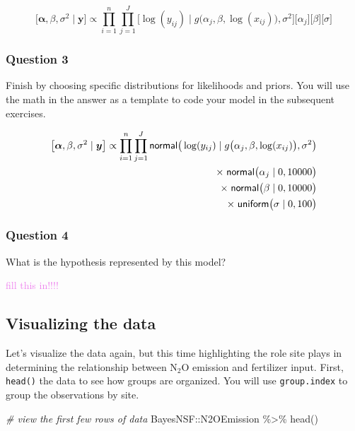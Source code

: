 \documentclass[
]{article}
\newenvironment{Shaded}{\begin{snugshade}}{\end{snugshade}}
\newcommand{\CommentTok}[1]{\textcolor[rgb]{0.56,0.35,0.01}{\textit{#1}}}
\newcommand{\FunctionTok}[1]{\textcolor[rgb]{0.00,0.00,0.00}{#1}}
\newcommand{\NormalTok}[1]{#1}
\newcommand{\SpecialCharTok}[1]{\textcolor[rgb]{0.00,0.00,0.00}{#1}}
\begin{document}
\[
\bigl[ \boldsymbol{\alpha},\beta,\sigma^2 \mid \boldsymbol{y} \bigr] \propto \prod_{i=1}^{n} \prod_{j=1}^{J}  \bigl[ \log(y_{ij})\mid g\bigl(\alpha_{j},\beta,\log(x_{ij})\bigr),\sigma^{2} \bigr] \bigl[\alpha_{j} \bigr] \bigl[ \beta \bigr] \bigl[ \sigma  \bigr]
\]

\hypertarget{question-3-1}{%
\subsubsection{Question 3}\label{question-3-1}}

Finish by choosing specific distributions for likelihoods and priors.
You will use the math in the answer as a template to code your model in
the subsequent exercises.

\[
\begin{aligned}
\bigl[ \boldsymbol{\alpha},\beta,\sigma^2 \mid \boldsymbol{y} \bigr] \propto \prod_{i=1}^{n}  \prod_{j=1}^{J} {\sf normal} \bigr( \log(y_{ij}) \mid g \bigl( \alpha_{j}, \beta, \log(x_{ij})  \bigr), \sigma^{2}\bigr)\\
\times \; {\sf normal} \bigr(\alpha_{j} \mid 0,10000\bigr) \\ 
\times \; {\sf normal} \bigr(\beta \mid 0,10000\bigr) \\
\times \; {\sf uniform}\bigr(\sigma \mid 0, 100 \bigl)
\end{aligned}
\]

\hypertarget{question-4-1}{%
\subsubsection{Question 4}\label{question-4-1}}

What is the hypothesis represented by this model?

\textcolor{violet}{fill this in!!!!}

\hypertarget{visualizing-the-data}{%
\subsection{Visualizing the data}\label{visualizing-the-data}}

Let's visualize the data again, but this time highlighting the role site
plays in determining the relationship between
\(\textrm{N} _2 \textrm{O}\) emission and fertilizer input. First,
\texttt{head()} the data to see how groups are organized. You will use
\texttt{group.index} to group the observations by site.

\begin{Shaded}
\begin{Highlighting}[]
\CommentTok{\# view the first few rows of data}
\NormalTok{BayesNSF}\SpecialCharTok{::}\NormalTok{N2OEmission }\SpecialCharTok{\%\textgreater{}\%} 
  \FunctionTok{head}\NormalTok{()}
\end{Highlighting}
\end{Shaded}
\end{document}

